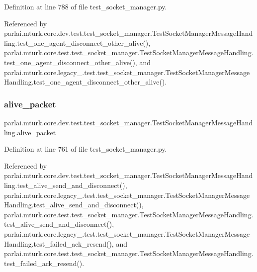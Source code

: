 Definition at line 788 of file test\+\_\+socket\+\_\+manager.\+py.



Referenced by parlai.\+mturk.\+core.\+dev.\+test.\+test\+\_\+socket\+\_\+manager.\+Test\+Socket\+Manager\+Message\+Handling.\+test\+\_\+one\+\_\+agent\+\_\+disconnect\+\_\+other\+\_\+alive(), parlai.\+mturk.\+core.\+test.\+test\+\_\+socket\+\_\+manager.\+Test\+Socket\+Manager\+Message\+Handling.\+test\+\_\+one\+\_\+agent\+\_\+disconnect\+\_\+other\+\_\+alive(), and parlai.\+mturk.\+core.\+legacy\+\_.\+test.\+test\+\_\+socket\+\_\+manager.\+Test\+Socket\+Manager\+Message\+Handling.\+test\+\_\+one\+\_\+agent\+\_\+disconnect\+\_\+other\+\_\+alive().

\mbox{\label{classparlai_1_1mturk_1_1core_1_1dev_1_1test_1_1test__socket__manager_1_1TestSocketManagerMessageHandling_a50921bd46b7a75539519abdec05b272d}} 
\subsubsection{\texorpdfstring{alive\+\_\+packet}{alive\_packet}}
{\footnotesize\ttfamily parlai.\+mturk.\+core.\+dev.\+test.\+test\+\_\+socket\+\_\+manager.\+Test\+Socket\+Manager\+Message\+Handling.\+alive\+\_\+packet}



Definition at line 761 of file test\+\_\+socket\+\_\+manager.\+py.



Referenced by parlai.\+mturk.\+core.\+dev.\+test.\+test\+\_\+socket\+\_\+manager.\+Test\+Socket\+Manager\+Message\+Handling.\+test\+\_\+alive\+\_\+send\+\_\+and\+\_\+disconnect(), parlai.\+mturk.\+core.\+legacy\+\_.\+test.\+test\+\_\+socket\+\_\+manager.\+Test\+Socket\+Manager\+Message\+Handling.\+test\+\_\+alive\+\_\+send\+\_\+and\+\_\+disconnect(), parlai.\+mturk.\+core.\+test.\+test\+\_\+socket\+\_\+manager.\+Test\+Socket\+Manager\+Message\+Handling.\+test\+\_\+alive\+\_\+send\+\_\+and\+\_\+disconnect(), parlai.\+mturk.\+core.\+legacy\+\_.\+test.\+test\+\_\+socket\+\_\+manager.\+Test\+Socket\+Manager\+Message\+Handling.\+test\+\_\+failed\+\_\+ack\+\_\+resend(), and parlai.\+mturk.\+core.\+test.\+test\+\_\+socket\+\_\+manager.\+Test\+Socket\+Manager\+Message\+Handling.\+test\+\_\+failed\+\_\+ack\+\_\+resend().

